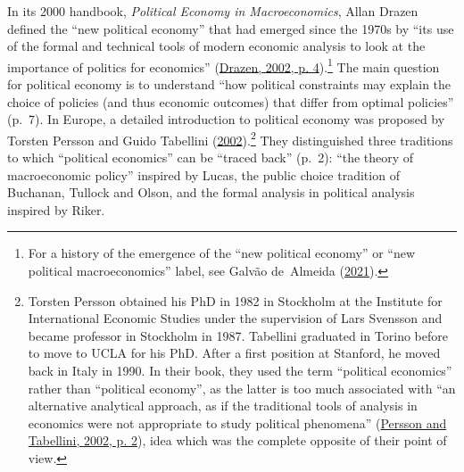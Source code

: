\documentclass[
]{article}
\begin{document}
In its 2000 handbook, \emph{Political Economy in Macroeconomics}, Allan
Drazen defined the ``new political economy'' that had emerged since the
1970s by ``its use of the formal and technical tools of modern economic
analysis to look at the importance of politics for economics''
(\protect\hyperlink{ref-drazen2002}{Drazen, 2002, p. 4}).\footnote{For a
  history of the emergence of the ``new political economy'' or ``new
  political macroeconomics'' label, see Galvão de~Almeida
  (\protect\hyperlink{ref-galvaodealmeida2021}{2021}).} The main
question for political economy is to understand ``how political
constraints may explain the choice of policies (and thus economic
outcomes) that differ from optimal policies'' (p.~7). In Europe, a
detailed introduction to political economy was proposed by Torsten
Persson and Guido Tabellini
(\protect\hyperlink{ref-persson2002}{2002}).\footnote{Torsten Persson
  obtained his PhD in 1982 in Stockholm at the Institute for
  International Economic Studies under the supervision of Lars Svensson
  and became professor in Stockholm in 1987. Tabellini graduated in
  Torino before to move to UCLA for his PhD. After a first position at
  Stanford, he moved back in Italy in 1990. In their book, they used the
  term ``political economics'' rather than ``political economy'', as the
  latter is too much associated with ``an alternative analytical
  approach, as if the traditional tools of analysis in economics were
  not appropriate to study political phenomena''
  (\protect\hyperlink{ref-persson2002}{Persson and Tabellini, 2002, p.
  2}), idea which was the complete opposite of their point of view.}
They distinguished three traditions to which ``political economics'' can
be ``traced back'' (p.~2): ``the theory of macroeconomic policy''
inspired by Lucas, the public choice tradition of Buchanan, Tullock and
Olson, and the formal analysis in political analysis inspired by Riker.
\end{document}

